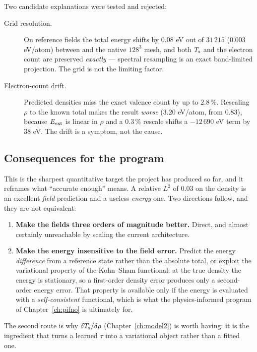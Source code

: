 Two candidate explanations were tested and rejected:

\begin{description}
  \item[Grid resolution.] On reference fields the total energy shifts by
    $0.08$ eV out of $31\,215$ ($0.003$ eV/atom) between 
    and the native $128^3$ mesh, and both $T_{\mathrm{s}}$ and the electron count are
    preserved \emph{exactly} --- spectral resampling is an exact band-limited
    projection. The grid is not the limiting factor.
  \item[Electron-count drift.] Predicted densities miss the exact valence count
    by up to $2.8\,\%$. Rescaling $\rho$ to the known total makes the result
    \emph{worse} ($3.20$ eV/atom, from $0.83$), because $E_{\rm ext}$ is linear
    in $\rho$ and a $0.3\,\%$ rescale shifts a $-12\,690$ eV term by $38$ eV.
    The drift is a symptom, not the cause.
\end{description}

\subsection{Consequences for the program}

This is the sharpest quantitative target the project has produced so far, and
it reframes what ``accurate enough'' means. A relative $L^{2}$ of $0.03$ on the
density is an excellent \emph{field} prediction and a useless \emph{energy}
one. Two directions follow, and they are not equivalent:

\begin{enumerate}
  \item \textbf{Make the fields three orders of magnitude better.} Direct, and
    almost certainly unreachable by scaling the current architecture.
  \item \textbf{Make the energy insensitive to the field error.} Predict the
    energy \emph{difference} from a reference state rather than the absolute
    total, or exploit the variational property of the Kohn--Sham functional:
    at the true density the energy is stationary, so a first-order density
    error produces only a second-order energy error. That property is
    available only if the energy is evaluated with a \emph{self-consistent}
    functional, which is what the physics-informed program of
    Chapter~\ref{ch:pifno} is ultimately for.
\end{enumerate}

The second route is why $\delta T_{\mathrm{s}}/\delta\rho$ (Chapter~\ref{ch:model2}) is
worth having: it is the ingredient that turns a learned $\tau$ into a
variational object rather than a fitted one.

